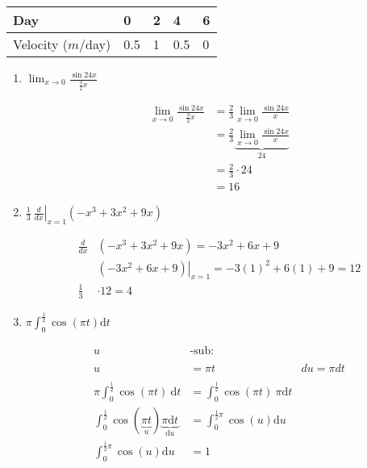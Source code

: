 \documentclass[]{article}
\begin{document}
\begin{table}
	\centering
	\begin{tabular}{|l|l|l|l|l|}
		\hline
		Day              & 0 & 2 & 4   & 6 \\ \hline
		Velocity ($m$/day) & 0.5 & 1 & 0.5 & 0 \\ \hline
	\end{tabular}
\end{table}

\pagebreak\noindent
\begin{enumerate}
	\item$\displaystyle \lim_{x \to 0}\frac{\sin 24x}{\frac{3}{2}x}$
	
	\begin{align*}
		\lim_{x \to 0}\frac{\sin 24x}{\frac{3}{2}x} &= \frac{2}{3}\lim_{x \to 0}\frac{\sin 24x}{x} \\
		&= \frac{2}{3}\underbrace{\lim_{x \to 0}\frac{\sin 24x}{x}}_{24} \\
		&= \frac{2}{3} \cdot 24 \\
		&= \boxed{16}
	\end{align*}
	
	\item$\displaystyle \frac{1}{3}\:\left.\frac{d}{dx}\right|_{x=1}\left(-x^3+3x^2+9x\right)$
	
	\begin{align*}
		\frac{d}{dx}&\left(-x^3+3x^2+9x\right) = -3x^2 + 6x + 9 \\
		&\left.\left(-3x^2 + 6x + 9\right)\right|_{x=1} = -3(1)^2+6(1)+9 = 12 \\
		\frac{1}{3}&\cdot12 = \boxed{4}
	\end{align*}
	
	\item$\displaystyle \pi\int_0^{\frac{1}{2}}\cos(\pi t)\text{d}t$
	
	\begin{align*}
		u&\text{-sub:} \\ \\
		u&=\pi t & du = \pi dt \\ \\
		\pi\int_0^{\frac{1}{2}}\cos({\pi t}){\:\text{d}t} &= \int_0^{\frac{1}{2}}\cos({\pi t}){\:\pi\text{d}t} \\
		\int_0^{\frac{1}{2}}\cos(\underbrace{\pi t}_{u})\underbrace{\pi\text{d}t}_{\text{d}u} &= \int_0^{\frac{1}{2}\pi}\cos(u)\text{d}u \\
		\int_0^{\frac{1}{2}\pi}\cos(u)\text{d}u &= \boxed{1}
	\end{align*}
	

\end{enumerate}
\end{document}
